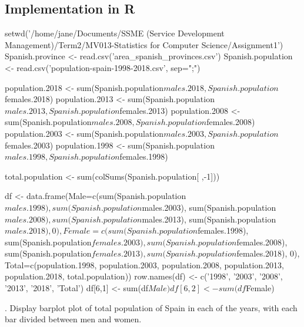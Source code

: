 \documentclass[12pt, oneside]{report}\usepackage[]{graphicx}\usepackage[]{color}
\begin{document}
\subsection*{Implementation in R}
\begin{Schunk}
\begin{Sinput}
setwd('/home/jane/Documents/SSME (Service Development Management)/Term2/MV013-Statistics for Computer Science/Assignment1')
Spanish.province <- read.csv('area_spanish_provinces.csv')
Spanish.population <- read.csv('population-spain-1998-2018.csv', sep=";")

population.2018 <- sum(Spanish.population$males.2018, Spanish.population$females.2018)
population.2013 <- sum(Spanish.population$males.2013, Spanish.population$females.2013)
population.2008 <- sum(Spanish.population$males.2008, Spanish.population$females.2008)
population.2003 <- sum(Spanish.population$males.2003, Spanish.population$females.2003)
population.1998 <- sum(Spanish.population$males.1998, Spanish.population$females.1998)

total.population <- sum(colSums(Spanish.population[ ,-1]))

df <- data.frame(Male=c(sum(Spanish.population$males.1998), sum(Spanish.population$males.2003), 
                        sum(Spanish.population$males.2008), sum(Spanish.population$males.2013), 
                        sum(Spanish.population$males.2018), 0),
                 Female=c(sum(Spanish.population$females.1998), sum(Spanish.population$females.2003), 
                          sum(Spanish.population$females.2008), sum(Spanish.population$females.2013), 
                          sum(Spanish.population$females.2018), 0),
                 Total=c(population.1998, population.2003, population.2008, population.2013, population.2018, total.population))
row.names(df) <- c('1998', '2003', '2008', '2013', '2018', 'Total')
df[6,1] <- sum(df$Male)
df[6,2] <- sum(df$Female)
\end{Sinput}
\end{Schunk}

. Display barplot plot of total population of Spain in each of the years, with each bar divided
between men and women.
\end{document}
